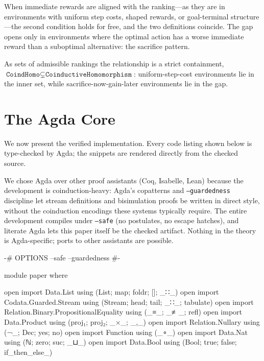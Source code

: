 \documentclass[runningheads]{llncs}
\begin{document}
When immediate rewards are aligned with the ranking---as they are in environments with uniform step costs, shaped rewards, or goal-terminal structure---the second condition holds for free, and the two definitions coincide.  The gap opens only in environments where the optimal action has a worse immediate reward than a suboptimal alternative: the sacrifice pattern.

As sets of admissible rankings the relationship is a strict containment, $\mathrm{\texttt{CoindHomo}} \subsetneq \mathrm{\texttt{CoinductiveHomomorphism}}$: uniform-step-cost environments lie in the inner set, while sacrifice-now-gain-later environments lie in the gap.


\section{The Agda Core}\label{sec:agda-core}

We now present the verified implementation.  Every code listing shown below is type-checked by Agda; the snippets are rendered directly from the checked source.

We chose Agda over other proof assistants (Coq, Isabelle, Lean) because the development is coinduction-heavy: Agda's copatterns and \texttt{--guardedness} discipline let stream definitions and bisimulation proofs be written in direct style, without the coinduction encodings these systems typically require.  The entire development compiles under \texttt{--safe} (no postulates, no escape hatches), and literate Agda lets this paper itself be the checked artifact.  Nothing in the theory is Agda-specific; ports to other assistants are possible.

\begin{code}[hide]
{-# OPTIONS --safe --guardedness #-}

module paper where

open import Data.List using (List; map; foldr; []; _∷_)
open import Codata.Guarded.Stream using (Stream; head; tail; _∷_; tabulate)
open import Relation.Binary.PropositionalEquality using (_≡_; _≢_; refl)
open import Data.Product using (proj₁; proj₂; _×_; _,_)
open import Relation.Nullary using (¬_; Dec; yes; no)
open import Function using (_∘_)
open import Data.Nat using (ℕ; zero; suc; _⊔_)
open import Data.Bool using (Bool; true; false; if_then_else_)
\end{code}
\end{document}
